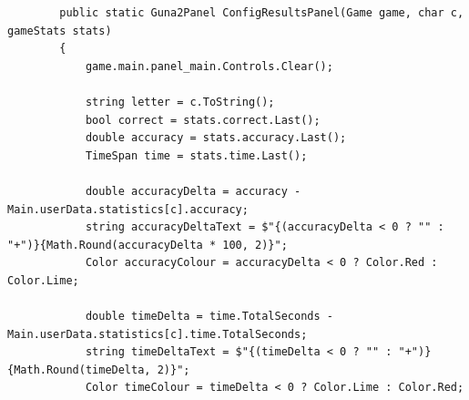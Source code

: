 \documentclass{article}
\begin{document}
\begin{verbatim}
		public static Guna2Panel ConfigResultsPanel(Game game, char c, gameStats stats)
		{
			game.main.panel_main.Controls.Clear();

			string letter = c.ToString();
			bool correct = stats.correct.Last();
			double accuracy = stats.accuracy.Last();
			TimeSpan time = stats.time.Last();

			double accuracyDelta = accuracy - Main.userData.statistics[c].accuracy;
			string accuracyDeltaText = $"{(accuracyDelta < 0 ? "" : "+")}{Math.Round(accuracyDelta * 100, 2)}";
			Color accuracyColour = accuracyDelta < 0 ? Color.Red : Color.Lime;

			double timeDelta = time.TotalSeconds - Main.userData.statistics[c].time.TotalSeconds;
			string timeDeltaText = $"{(timeDelta < 0 ? "" : "+")}{Math.Round(timeDelta, 2)}";
			Color timeColour = timeDelta < 0 ? Color.Lime : Color.Red;


\end{verbatim}
\end{document}
